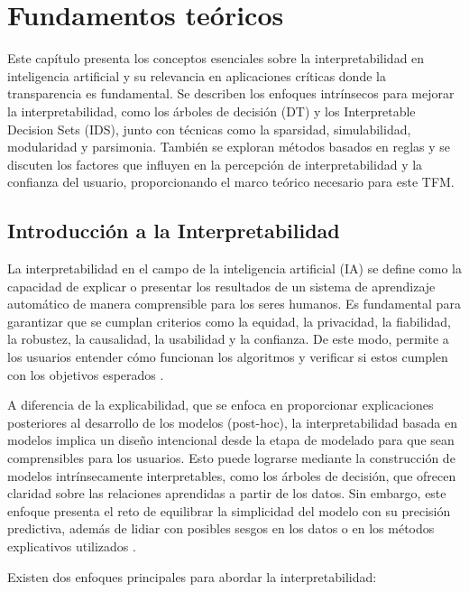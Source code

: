 \chapter{Fundamentos teóricos}

Este capítulo presenta los conceptos esenciales sobre la interpretabilidad en inteligencia artificial y su relevancia en aplicaciones críticas donde la transparencia es fundamental. Se describen los enfoques intrínsecos para mejorar la interpretabilidad, como los árboles de decisión (DT) y los Interpretable Decision Sets (IDS), junto con técnicas como la sparsidad, simulabilidad, modularidad y parsimonia. También se exploran métodos basados en reglas y se discuten los factores que influyen en la percepción de interpretabilidad y la confianza del usuario, proporcionando el marco teórico necesario para este TFM.

\section{Introducción a la Interpretabilidad}

La interpretabilidad en el campo de la inteligencia artificial (IA) se define como la capacidad de explicar o presentar los resultados de un sistema de aprendizaje automático de manera comprensible para los seres humanos. Es fundamental para garantizar que se cumplan criterios como la equidad, la privacidad, la fiabilidad, la robustez, la causalidad, la usabilidad y la confianza. De este modo, permite a los usuarios entender cómo funcionan los algoritmos y verificar si estos cumplen con los objetivos esperados \cite{doshi2017towards, gunning2019xai}.

A diferencia de la explicabilidad, que se enfoca en proporcionar explicaciones posteriores al desarrollo de los modelos (post-hoc), la interpretabilidad basada en modelos implica un diseño intencional desde la etapa de modelado para que sean comprensibles para los usuarios. Esto puede lograrse mediante la construcción de modelos intrínsecamente interpretables, como los árboles de decisión, que ofrecen claridad sobre las relaciones aprendidas a partir de los datos. Sin embargo, este enfoque presenta el reto de equilibrar la simplicidad del modelo con su precisión predictiva, además de lidiar con posibles sesgos en los datos o en los métodos explicativos utilizados \cite{murdoch2019interpretable, Kaur-2020}.

Existen dos enfoques principales para abordar la interpretabilidad:

